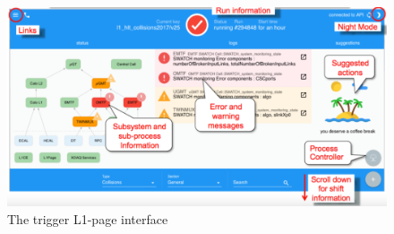 \documentclass{article}
\begin{document}
\begin{figure}
\centering
\includegraphics[width=1.\textwidth]{figures/TriggerShift_interface.pdf}
\caption{The trigger L1-page interface}
\label{pics:blablabla}
\end{figure}



\newpage
%
%
\end{document}
